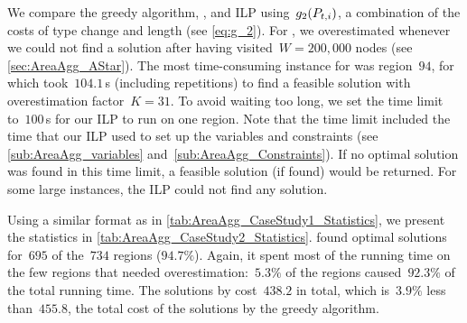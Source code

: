 \documentclass[acmsmall,natbib=false]{acmart}
\begin{document}
We compare the greedy algorithm, \Astar, and ILP
using~$g_2(P_{t,i})$,
a combination of the costs 
of type change and length (see \eq\ref{eq:g_2}).
For \Astar, we overestimated 
whenever we could not find a solution after 
having visited~$W=200{,}000$ nodes 
(see \sect\ref{sec:AreaAgg_AStar}).
The most time-consuming instance for \Astar was region~$94$,
for which \Astar took~$104.1\,$s (including repetitions)
to find a feasible solution 
with overestimation factor~$K=31$.
To avoid waiting too long,
we set the time limit to~$100\,$s 
for our ILP to run on one region.
Note that the time limit included
the time that our ILP used 
to set up the variables and constraints
(see \sects\ref{sub:AreaAgg_variables} 
and~\ref{sub:AreaAgg_Constraints}).
If no optimal solution was found in this time limit,
a feasible solution (if found) would be returned.
For some large instances, 
the ILP could not find any solution.

Using a similar format as in 
\tab\ref{tab:AreaAgg_CaseStudy1_Statistics},
we present the statistics in 
\tab\ref{tab:AreaAgg_CaseStudy2_Statistics}.
\Astar found optimal solutions 
for~$695$ of the~$734$ regions ($94.7\%$).
Again, it spent most of the running time 
on the few regions that needed 
overestimation:~$5.3\%$ of the regions 
caused~$92.3\%$ of the total running time.
The solutions by \Astar cost~$438.2$ in total, 
which is~$3.9\%$ less than~$455.8$, 
the total cost of the solutions by the greedy algorithm.
\end{document}
